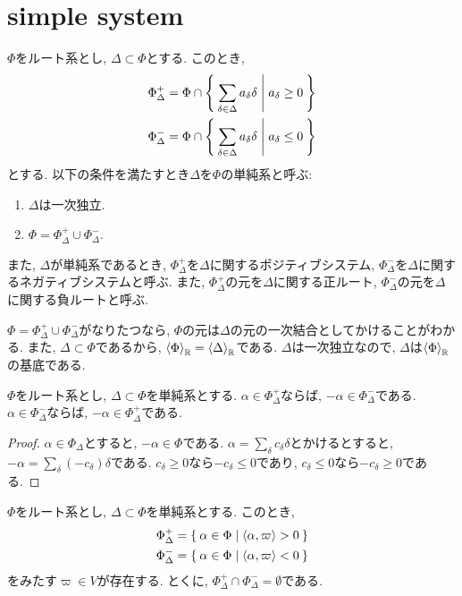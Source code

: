 \section{simple system}
\begin{definition}
  $\Phi$をルート系とし, $\Delta\subset\Phi$とする.
  このとき,
  \begin{align*}
    \Phi_{\Delta}^{+}&=\Phi\cap \Set{\sum_{\delta\in\Delta}a_\delta \delta|a_\delta \geq 0}\\
    \Phi_{\Delta}^{-}&=\Phi\cap \Set{\sum_{\delta\in\Delta}a_\delta \delta|a_\delta \leq 0}
  \end{align*}
  とする.
  以下の条件を満たすとき$\Delta$を$\Phi$の単純系と呼ぶ:
  \begin{enumerate}
  \item $\Delta$は一次独立. %
  \item $\Phi = \Phi_\Delta^{+}\cup \Phi_\Delta^{-}$.
  \end{enumerate}
  また, $\Delta$が単純系であるとき,
  $\Phi_{\Delta}^+$を$\Delta$に関するポジティブシステム,
  $\Phi_{\Delta}^-$を$\Delta$に関するネガティブシステムと呼ぶ.
  また,
  $\Phi_{\Delta}^+$の元を$\Delta$に関する正ルート,
  $\Phi_{\Delta}^-$の元を$\Delta$に関する負ルートと呼ぶ.
\end{definition}
\begin{remark}
  $\Phi = \Phi_\Delta^{+}\cup \Phi_\Delta^{-}$がなりたつなら, $\Phi$の元は$\Delta$の元の一次結合としてかけることがわかる.
  また, $\Delta\subset\Phi$であるから,
  $\Braket{\Phi}_{\mathbb{R}}=\Braket{\Delta}_{\mathbb{R}}$である.
  $\Delta$は一次独立なので, $\Delta$は$\Braket{\Phi}_{\mathbb{R}}$の基底である.
\end{remark}
\begin{prop}
  \label{prop:posinega}
  $\Phi$をルート系とし, $\Delta\subset\Phi$を単純系とする.
  $\alpha\in\Phi_\Delta^+$ならば, $-\alpha\in\Phi_\Delta^-$である.
  $\alpha\in\Phi_\Delta^-$ならば, $-\alpha\in\Phi_\Delta^+$である.
\end{prop}
\begin{proof}
  $\alpha\in\Phi_\Delta$とすると,
  $-\alpha\in\Phi$である.
  $\alpha=\sum_{\delta}c_\delta\delta$とかけるとすると,
  $-\alpha=\sum_{\delta}(-c_\delta)\delta$である.
  $c_\delta\geq 0$なら$-c_\delta\leq 0$であり,
  $c_\delta\leq 0$なら$-c_\delta\geq 0$である.  
\end{proof}
\begin{prop}
  \label{lemma:cone:sparable}
  $\Phi$をルート系とし, $\Delta\subset\Phi$を単純系とする.
  このとき,
  \begin{align*}
    \Phi_{\Delta}^+&=\Set{\alpha\in\Phi | \Braket{\alpha,\varpi} > 0}\\
    \Phi_{\Delta}^-&=\Set{\alpha\in\Phi | \Braket{\alpha,\varpi} < 0}
  \end{align*}
  をみたす$\varpi\in V$が存在する.
  とくに, 
  $\Phi_{\Delta}^+\cap\Phi_{\Delta}^-=\emptyset$である.
\end{prop}
